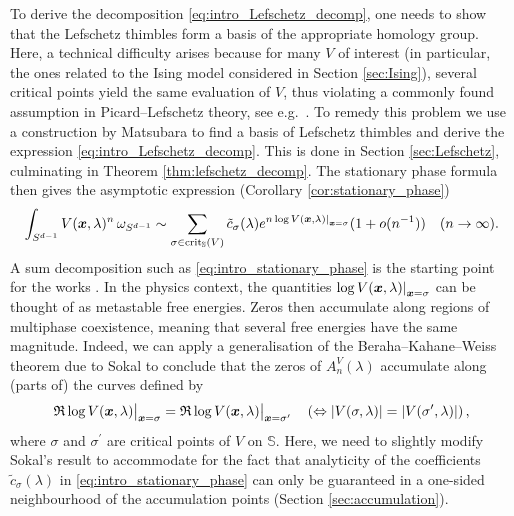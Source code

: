 \documentclass[11pt, a4paper]{article}
\numberwithin{theorem}{section}
\theoremstyle{remark}
\DeclareMathOperator{\crit}{crit}
\renewcommand{\Re}{\mathfrak{R}}
\newcommand{\bb}[1]{\boldsymbol{#1}}
\newcommand{\Sc}{\mathbb{S}}
\newcommand\restr[2]{{%
  \left.\kern-\nulldelimiterspace %
  #1 %
  \littletaller %
  \right|_{#2} %
  }}
\newcommand{\littletaller}{\mathchoice{\vphantom{\big|}}{}{}{}}
\theoremstyle{theorem}
\begin{document}
To derive the decomposition \eqref{eq:intro_Lefschetz_decomp}, one needs to show that the Lefschetz thimbles form a basis of the appropriate homology group. Here, a technical difficulty arises because for many $V$ of interest (in particular, the ones related to the Ising model considered in Section \ref{sec:Ising}), several critical points yield the same evaluation of $V$, thus violating a commonly found assumption in Picard--Lefschetz theory, see e.g.\ \cite[Hypothesis H4]{delabaere2002global}. 
To remedy this problem we use a construction by Matsubara \cite{matsubara2023localization} to find a basis of Lefschetz thimbles and derive the expression \eqref{eq:intro_Lefschetz_decomp}. 
This is done in Section \ref{sec:Lefschetz}, culminating in Theorem \ref{thm:lefschetz_decomp}. The stationary phase formula then gives the asymptotic expression (Corollary \ref{cor:stationary_phase})
\begin{equation}
  \label{eq:intro_stationary_phase}
  \int_{S^{d-1}} V(\bb{x},\lambda)^{n} \,\omega_{S^{d-1}} \sim  \sum_{\sigma\in\crit_{\Sc}(V)}\tilde{c}_{\sigma}(\lambda) e^{n \log \restr{V(\bb{x},\lambda)}{\bb{x}=\sigma}} (1+ o(n^{-1})) \quad (n\to\infty).
\end{equation} 
A sum decomposition such as \eqref{eq:intro_stationary_phase} is the starting point for the works \cite{sokal2004chromatic,biskup2004partition}. In the physics context, the quantities $\log \restr{V(\bb{x},\lambda)}{\bb{x}=\sigma}$ can be thought of as metastable free energies. Zeros then accumulate along regions of multiphase coexistence, meaning that several free energies have the same magnitude.
Indeed, we can apply a generalisation of the Beraha--Kahane--Weiss theorem due to Sokal \cite[Theorem 1.5]{sokal2004chromatic} to conclude that the zeros of $A^V_n(\lambda)$ accumulate along (parts of) the curves defined by
\begin{equation}
  \label{eq:intro_limit_curve}
  \Re \log \restr{V(\bb{x},\lambda)}{\bb{x}=\sigma} = \Re \log \restr{V(\bb{x},\lambda)}{\bb{x}=\sigma'} \quad \left( \Leftrightarrow |V(\sigma,\lambda)| = |V(\sigma^\prime,\lambda)| \right),
\end{equation}
where $\sigma$ and $\sigma^\prime$ are critical points of $V$ on $\Sc$. Here, we need to slightly modify Sokal's result to accommodate for the fact that analyticity of the coefficients $\tilde{c}_\sigma(\lambda)$ in \eqref{eq:intro_stationary_phase} can only be guaranteed in a one-sided neighbourhood of the accumulation points (Section \ref{sec:accumulation}). \par
\end{document}
